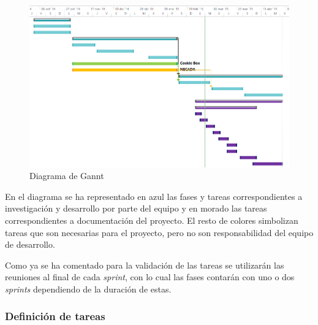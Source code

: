 \begin{figure}[ht]
    \centering
    \includegraphics[width=1.0\linewidth]{GEP/planning/gannt.PNG}
    \caption[Diagrama de Gannt]{Diagrama de Gannt}
    \label{fig:diagrama_gantt}
\end{figure}
\FloatBarrier

En el diagrama se ha representado en azul las fases y tareas correspondientes a investigación y desarrollo por parte del equipo y en morado las tareas correspondientes a documentación del proyecto. El resto de colores simbolizan tareas que son necesarias para el proyecto, pero no son responsabilidad del equipo de desarrollo.

Como ya se ha comentado para la validación de las tareas se utilizarán las reuniones al final de cada \textit{sprint}, con lo cual las fases contarán con uno o dos \textit{sprints} dependiendo de la duración de estas.

\subsubsection{Definición de tareas}

